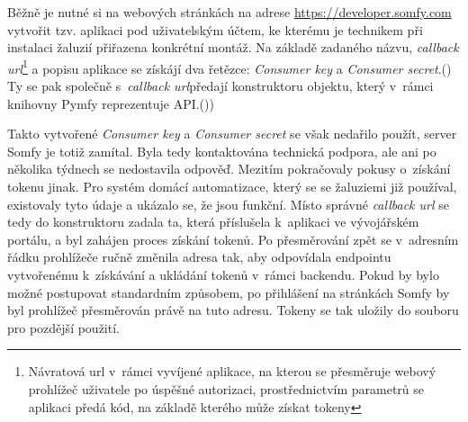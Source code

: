     Běžně je nutné si na webových stránkách na adrese \href{https://develeoper.somfy.com}{https://developer.som\-fy.com} vytvořit tzv. aplikaci pod uživatelským účtem, ke kterému je technikem při instalaci žaluzií přiřazena konkrétní montáž. Na základě zadaného názvu, \emph{callback \acrshort{url}}\footnote[1]{Návratová \acrshort{url} v~rámci vyvíjené aplikace, na kterou se přesměruje webový prohlížeč uživatele po úspěšné autorizaci, prostřednictvím parametrů se aplikaci předá kód, na základě kterého může získat tokeny} a popisu aplikace se získájí dva řetězce: \emph{Consumer key} a \emph{Consumer secret}.(\cite{somfy:api}) Ty se pak společně s~\emph{callback \acrshort{url}}\footnotemark[1] předají konstruktoru objektu, který v~rámci knihovny Pymfy reprezentuje API.()\cite{tetienne:pymfy})

    Takto vytvořené \emph{Consumer key} a \emph{Consumer secret} se však nedařilo použít, server Somfy je totiž zamítal. Byla tedy kontaktována technická podpora, ale ani po několika týdnech se nedostavila odpověď. Mezitím pokračovaly pokusy o~získání tokenu jinak. Pro systém domácí automatizace, který se se žaluziemi již používal, existovaly tyto údaje a ukázalo se, že jsou funkční. Místo správné \emph{callback \acrshort{url}} se tedy do konstruktoru zadala ta, která příslušela k~aplikaci ve vývojářském portálu, a byl zahájen proces získání tokenů. Po přesměrování zpět se v~adresním řádku prohlížeče ručně změnila adresa tak, aby odpovídala endpointu vytvořenému k~získávání a ukládání tokenů v~rámci backendu. Pokud by bylo možné postupovat standardním způsobem, po přihlášení na stránkách Somfy by byl prohlížeč přesměrován právě na tuto adresu. Tokeny se tak uložily do souboru  pro pozdější použití.


